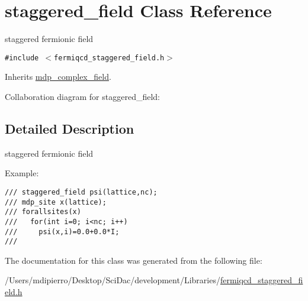 \hypertarget{classstaggered__field}{
\section{staggered\_\-field Class Reference}
\label{classstaggered__field}
}
staggered fermionic field  


{\tt \#include $<$fermiqcd\_\-staggered\_\-field.h$>$}

Inherits \hyperlink{classmdp__complex__field}{mdp\_\-complex\_\-field}.

Collaboration diagram for staggered\_\-field:

\subsection{Detailed Description}
staggered fermionic field 

Example: 

\footnotesize\begin{verbatim}
/// staggered_field psi(lattice,nc);
/// mdp_site x(lattice);
/// forallsites(x)
///   for(int i=0; i<nc; i++)
///     psi(x,i)=0.0+0.0*I;
/// \end{verbatim}
\normalsize
 

The documentation for this class was generated from the following file:\begin{CompactItemize}
\item 
/Users/mdipierro/Desktop/SciDac/development/Libraries/\hyperlink{fermiqcd__staggered__field_8h}{fermiqcd\_\-staggered\_\-field.h}\end{CompactItemize}
